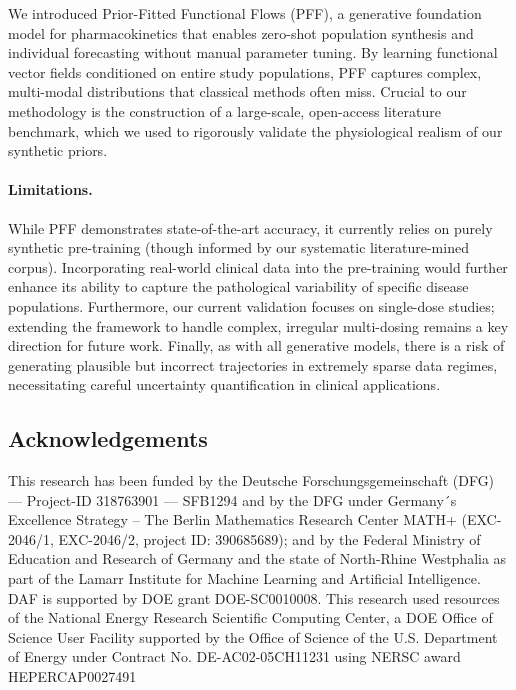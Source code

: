 
We introduced Prior-Fitted Functional Flows (PFF), a generative foundation model for pharmacokinetics that enables zero-shot population synthesis and individual forecasting without manual parameter tuning. By learning functional vector fields conditioned on entire study populations, PFF captures complex, multi-modal distributions that classical methods often miss. Crucial to our methodology is the construction of a large-scale, open-access literature benchmark, which we used to rigorously validate the physiological realism of our synthetic priors.
\paragraph{Limitations.} While PFF demonstrates state-of-the-art accuracy, it currently relies on purely synthetic pre-training (though informed by our systematic literature-mined corpus). Incorporating real-world clinical data into the pre-training would further enhance its ability to capture the pathological variability of specific disease populations. Furthermore, our current validation focuses on single-dose studies; extending the framework to handle complex, irregular multi-dosing remains a key direction for future work. Finally, as with all generative models, there is a risk of generating plausible but incorrect trajectories in extremely sparse data regimes, necessitating careful uncertainty quantification in clinical applications.
\subsection*{Acknowledgements}
\label{sec:scknowledgement}

This research has been funded by the Deutsche Forschungsgemeinschaft (DFG) --- Project-ID 318763901 --- SFB1294 and by the DFG under Germany´s Excellence Strategy – The Berlin Mathematics
Research Center MATH+ (EXC-2046/1, EXC-2046/2, project ID: 390685689); and by the Federal Ministry of Education and Research of Germany and the state of North-Rhine Westphalia as part of the Lamarr Institute for Machine Learning and Artificial Intelligence. DAF is supported by DOE grant
DOE-SC0010008. This research used resources of the National Energy Research Scientific Computing Center, a DOE Office of
Science User Facility supported by the Office of Science of the U.S. Department of Energy under Contract No. DE-AC02-05CH11231 using NERSC award HEPERCAP0027491
